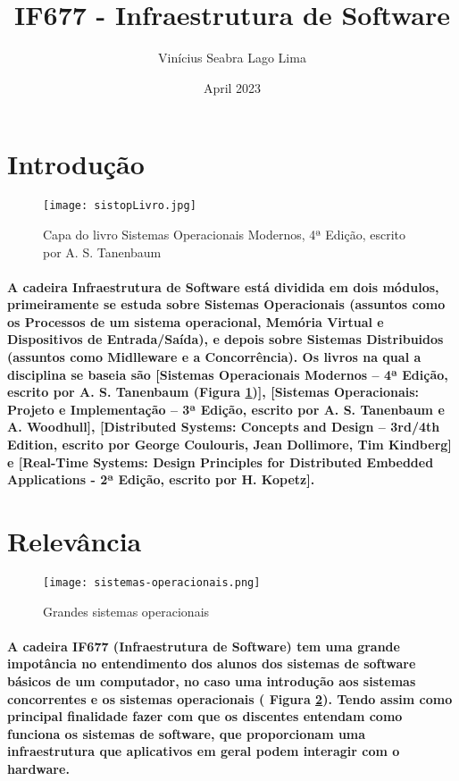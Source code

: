 \documentclass{article}
\title{IF677 - Infraestrutura de Software}
\author{Vinícius Seabra Lago Lima}
\date{April 2023}
\begin{document}
\maketitle

\section{Introdução}

\begin{figure}[ht]
    \centering
    \texttt{[image: sistopLivro.jpg]}
    \caption{Capa do livro Sistemas Operacionais Modernos, 4ª Edição, escrito por A. S. Tanenbaum} \cite{imagemlivro}
    \label{fig: imagemlivro}
\end{figure}
\paragraph{A cadeira Infraestrutura de Software está dividida em dois módulos, primeiramente se estuda sobre Sistemas Operacionais (assuntos como os Processos de um sistema operacional, Memória Virtual e Dispositivos de Entrada/Saída), e depois sobre Sistemas Distribuidos (assuntos como Midlleware e a Concorrência). Os livros na qual a disciplina se baseia são [Sistemas Operacionais Modernos – 4ª Edição, escrito por A. S. Tanenbaum (Figura \ref{fig: imagemlivro})], [Sistemas Operacionais: Projeto e Implementação – 3ª Edição, escrito por A. S. Tanenbaum e A. Woodhull], [Distributed Systems: Concepts and Design -- 3rd/4th Edition, escrito por George Coulouris, Jean Dollimore, Tim Kindberg] e [Real-Time Systems: Design Principles for Distributed Embedded Applications - 2ª  Edição, escrito por H. Kopetz].} 

\section{Relevância}

\begin{figure}[ht]
    \centering
    \texttt{[image: sistemas-operacionais.png]}
    \caption{Grandes sistemas operacionais}
    \label{fig: imagemsistsops}
\end{figure}

\paragraph{A cadeira IF677 (Infraestrutura de Software) tem uma grande impotância no entendimento dos alunos dos sistemas de software básicos de um computador, no caso uma introdução aos sistemas concorrentes e os sistemas operacionais ( Figura \ref{fig: imagemsistsops}). Tendo assim como principal finalidade fazer com que os discentes entendam como funciona os sistemas de software, que proporcionam uma infraestrutura que aplicativos em geral podem interagir com o hardware.}\cite{if677}
\end{document}
